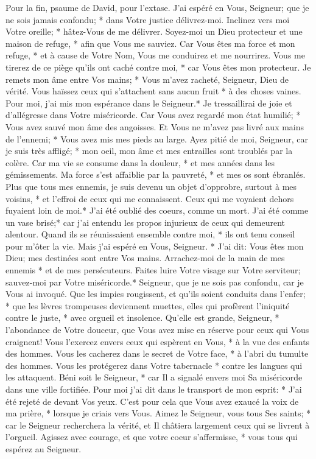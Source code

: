 Pour la fin, psaume de David, pour l'extase.
J'ai espéré en Vous, Seigneur; que je ne sois jamais confondu; * dans Votre justice délivrez-moi.
Inclinez vers moi Votre oreille; * hâtez-Vous de me délivrer. Soyez-moi un Dieu protecteur et une maison de refuge, * afin que Vous me sauviez.
Car Vous êtes ma force et mon refuge, * et à cause de Votre Nom, Vous me conduirez et me nourrirez.
Vous me tirerez de ce piège qu'ils ont caché contre moi, * car Vous êtes mon protecteur.
Je remets mon âme entre Vos mains; * Vous m'avez racheté, Seigneur, Dieu de vérité.
Vous haïssez ceux qui s'attachent sans aucun fruit * à des choses vaines. Pour moi, j'ai mis mon espérance dans le Seigneur.*
Je tressaillirai de joie et d'allégresse dans Votre miséricorde. Car Vous avez regardé mon état humilié; * Vous avez sauvé mon âme des angoisses.
Et Vous ne m'avez pas livré aux mains de l'ennemi; * Vous avez mis mes pieds au large.
Ayez pitié de moi, Seigneur, car je suis très affligé; * mon oeil, mon âme et mes entrailles sont troublés par la colère.
Car ma vie se consume dans la douleur, * et mes années dans les gémissements. Ma force s'est affaiblie par la pauvreté, * et mes os sont ébranlés.
Plus que tous mes ennemis, je suis devenu un objet d'opprobre, surtout à mes voisins, * et l'effroi de ceux qui me connaissent. Ceux qui me voyaient dehors fuyaient loin de moi.*
J'ai été oublié des coeurs, comme un mort. J'ai été comme un vase brisé;*
car j'ai entendu les propos injurieux de ceux qui demeurent alentour. Quand ils se réunissaient ensemble contre moi, * ils ont tenu conseil pour m'ôter la vie.
Mais j'ai espéré en Vous, Seigneur. * J'ai dit: Vous êtes mon Dieu;
mes destinées sont entre Vos mains. Arrachez-moi de la main de mes ennemis * et de mes persécuteurs.
Faites luire Votre visage sur Votre serviteur; sauvez-moi par Votre miséricorde.*
Seigneur, que je ne sois pas confondu, car je Vous ai invoqué. Que les impies rougissent, et qu'ils soient conduits dans l'enfer; *
que les lèvres trompeuses deviennent muettes, elles qui profèrent l'iniquité contre le juste, * avec orgueil et insolence.
Qu'elle est grande, Seigneur, * l'abondance de Votre douceur, que Vous avez mise en réserve pour ceux qui Vous craignent! Vous l'exercez envers ceux qui espèrent en Vous, * à la vue des enfants des hommes.
Vous les cacherez dans le secret de Votre face, * à l'abri du tumulte des hommes. Vous les protégerez dans Votre tabernacle * contre les langues qui les attaquent.
Béni soit le Seigneur, * car Il a signalé envers moi Sa miséricorde dans une ville fortifiée.
Pour moi j'ai dit dans le transport de mon esprit: * J'ai été rejeté de devant Vos yeux. C'est pour cela que Vous avez exaucé la voix de ma prière, * lorsque je criais vers Vous.
Aimez le Seigneur, vous tous Ses saints; * car le Seigneur recherchera la vérité, et Il châtiera largement ceux qui se livrent à l'orgueil.
Agissez avec courage, et que votre coeur s'affermisse, * vous tous qui espérez au Seigneur.

